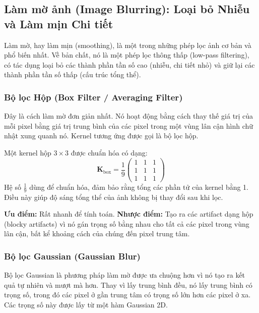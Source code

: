 \subsection{Làm mờ ảnh (Image Blurring): Loại bỏ Nhiễu và Làm mịn Chi tiết}
\label{subsec:image_blurring}
Làm mờ, hay làm mịn (smoothing), là một trong những phép lọc ảnh cơ bản và phổ biến nhất. Về bản chất, nó là một phép lọc thông thấp (low-pass filtering), có tác dụng loại bỏ các thành phần tần số cao (nhiễu, chi tiết nhỏ) và giữ lại các thành phần tần số thấp (cấu trúc tổng thể).

\subsubsection{Bộ lọc Hộp (Box Filter / Averaging Filter)}
\label{subsubsec:box_filter}
Đây là cách làm mờ đơn giản nhất. Nó hoạt động bằng cách thay thế giá trị của mỗi pixel bằng giá trị trung bình của các pixel trong một vùng lân cận hình chữ nhật xung quanh nó. Kernel tương ứng được gọi là bộ lọc hộp.

Một kernel hộp $3 \times 3$ được chuẩn hóa có dạng:
\begin{equation}
    \mathbf{K}_{\text{box}} = \frac{1}{9} 
    \begin{pmatrix} 
        1 & 1 & 1 \\ 
        1 & 1 & 1 \\ 
        1 & 1 & 1 
    \end{pmatrix}
\end{equation}
Hệ số $\frac{1}{9}$ dùng để chuẩn hóa, đảm bảo rằng tổng các phần tử của kernel bằng 1. Điều này giúp độ sáng tổng thể của ảnh không bị thay đổi sau khi lọc.

\textbf{Ưu điểm:} Rất nhanh để tính toán.
\textbf{Nhược điểm:} Tạo ra các artifact dạng hộp (blocky artifacts) vì nó gán trọng số bằng nhau cho tất cả các pixel trong vùng lân cận, bất kể khoảng cách của chúng đến pixel trung tâm.

\subsubsection{Bộ lọc Gaussian (Gaussian Blur)}
\label{subsubsec:gaussian_blur}
Bộ lọc Gaussian là phương pháp làm mờ được ưa chuộng hơn vì nó tạo ra kết quả tự nhiên và mượt mà hơn. Thay vì lấy trung bình đều, nó lấy trung bình có trọng số, trong đó các pixel ở gần trung tâm có trọng số lớn hơn các pixel ở xa. Các trọng số này được lấy từ một hàm Gaussian 2D.

